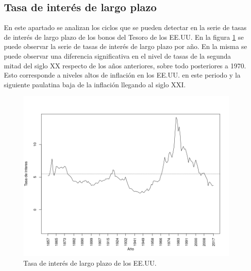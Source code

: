 \documentclass[a4paper]{article}
\begin{document}
\subsection{Tasa de interés de largo plazo}
En este apartado se analizan los ciclos que se pueden detectar en la serie de tasas de interés de largo plazo de los bonos del Tesoro de los EE.UU.
En la figura \ref{fig:ir_orig} se puede observar la serie de tasas de interés de largo plazo por año. En la misma se puede observar una diferencia significativa en el nivel de tasas de la segunda mitad del siglo XX respecto de los años anteriores, sobre todo posteriores a 1970. Esto corresponde a niveles altos de inflación en los EE.UU. en este periodo y la siguiente paulatina baja de la inflación llegando al siglo XXI.

\begin{figure}[H]
	\centering
	\includegraphics[width=0.75\linewidth]{ir_orig.png}
	
	\caption{Tasa de interés de largo plazo de los EE.UU.}
	\label{fig:ir_orig}
\end{figure}
\end{document}
